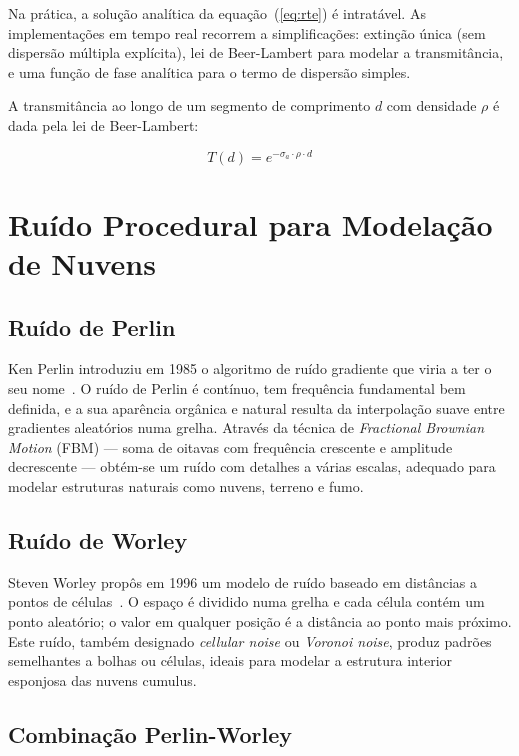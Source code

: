 Na prática, a solução analítica da equação~(\ref{eq:rte}) é intratável. As implementações em tempo real recorrem a simplificações: extinção única (sem dispersão múltipla explícita), lei de Beer-Lambert para modelar a transmitância, e uma função de fase analítica para o termo de dispersão simples.

A transmitância ao longo de um segmento de comprimento $d$ com densidade $\rho$ é dada pela lei de Beer-Lambert:

\begin{equation}
T(d) = e^{-\sigma_a \cdot \rho \cdot d}
\label{eq:beer}
\end{equation}

\section{Ruído Procedural para Modelação de Nuvens}
\label{chap2:sec:ruido}

\subsection{Ruído de Perlin}
\label{chap2:subsec:perlin}

Ken Perlin introduziu em 1985 o algoritmo de ruído gradiente que viria a ter o seu nome~\cite{perlin1985}. O ruído de Perlin é contínuo, tem frequência fundamental bem definida, e a sua aparência orgânica e natural resulta da interpolação suave entre gradientes aleatórios numa grelha. Através da técnica de \emph{Fractional Brownian Motion} (\ac{FBM}) --- soma de oitavas com frequência crescente e amplitude decrescente --- obtém-se um ruído com detalhes a várias escalas, adequado para modelar estruturas naturais como nuvens, terreno e fumo.

\subsection{Ruído de Worley}
\label{chap2:subsec:worley}

Steven Worley propôs em 1996 um modelo de ruído baseado em distâncias a pontos de células~\cite{worley1996}. O espaço é dividido numa grelha e cada célula contém um ponto aleatório; o valor em qualquer posição é a distância ao ponto mais próximo. Este ruído, também designado \emph{cellular noise} ou \emph{Voronoi noise}, produz padrões semelhantes a bolhas ou células, ideais para modelar a estrutura interior esponjosa das nuvens cumulus.

\subsection{Combinação Perlin-Worley}
\label{chap2:subsec:pw}

